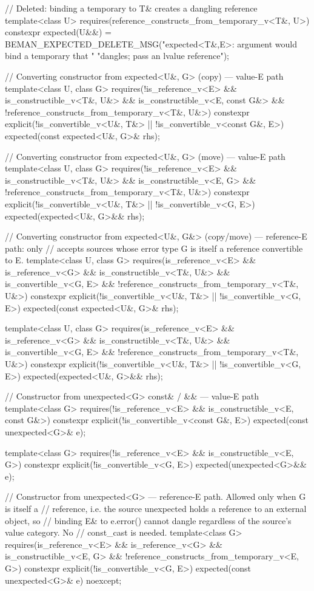 \begin{codeblock}
{  // Deleted: binding a temporary to T& creates a dangling reference
  template<class U>
    requires(reference_constructs_from_temporary_v<T&, U>)
  constexpr expected(U&&) =
      BEMAN_EXPECTED_DELETE_MSG("expected<T&,E>: argument would bind a temporary that "
                                "dangles; pass an lvalue reference");

  // Converting constructor from expected<U&, G> (copy) — value-E path
  template<class U, class G>
    requires(!is_reference_v<E> && is_constructible_v<T&, U&> &&
             is_constructible_v<E, const G&> &&
             !reference_constructs_from_temporary_v<T&, U&>)
  constexpr explicit(!is_convertible_v<U&, T&> || !is_convertible_v<const G&, E>)
      expected(const expected<U&, G>& rhs);

  // Converting constructor from expected<U&, G> (move) — value-E path
  template<class U, class G>
    requires(!is_reference_v<E> && is_constructible_v<T&, U&> &&
             is_constructible_v<E, G> && !reference_constructs_from_temporary_v<T&, U&>)
  constexpr explicit(!is_convertible_v<U&, T&> || !is_convertible_v<G, E>)
      expected(expected<U&, G>&& rhs);

  // Converting constructor from expected<U&, G&> (copy/move) — reference-E path: only
  // accepts sources whose error type G is itself a reference convertible to E.
  template<class U, class G>
    requires(is_reference_v<E> && is_reference_v<G> && is_constructible_v<T&, U&> &&
             is_convertible_v<G, E> && !reference_constructs_from_temporary_v<T&, U&>)
  constexpr explicit(!is_convertible_v<U&, T&> || !is_convertible_v<G, E>)
      expected(const expected<U&, G>& rhs);

  template<class U, class G>
    requires(is_reference_v<E> && is_reference_v<G> && is_constructible_v<T&, U&> &&
             is_convertible_v<G, E> && !reference_constructs_from_temporary_v<T&, U&>)
  constexpr explicit(!is_convertible_v<U&, T&> || !is_convertible_v<G, E>)
      expected(expected<U&, G>&& rhs);

  // Constructor from unexpected<G> const& / && — value-E path
  template<class G>
    requires(!is_reference_v<E> && is_constructible_v<E, const G&>)
  constexpr explicit(!is_convertible_v<const G&, E>) expected(const unexpected<G>& e);

  template<class G>
    requires(!is_reference_v<E> && is_constructible_v<E, G>)
  constexpr explicit(!is_convertible_v<G, E>) expected(unexpected<G>&& e);

  // Constructor from unexpected<G> — reference-E path. Allowed only when G is itself a
  // reference, i.e. the source unexpected holds a reference to an external object, so
  // binding E& to e.error() cannot dangle regardless of the source's value category. No
  // const_cast is needed.
  template<class G>
    requires(is_reference_v<E> && is_reference_v<G> && is_constructible_v<E, G> &&
             !reference_constructs_from_temporary_v<E, G>)
  constexpr explicit(!is_convertible_v<G, E>) expected(const unexpected<G>& e) noexcept;

}
\end{codeblock}
